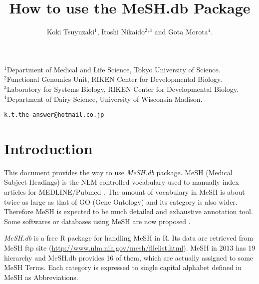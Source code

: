 \documentclass[11pt]{article}
\newcommand{\Rpackage}[1]{{\textit{#1}}}
\begin{document}

\title{\bf How to use the MeSH.db Package}
\author{Koki Tsuyuzaki$^1$, Itoshi Nikaido$^2$$^,$$^3$ and Gota Morota$^4$.}
\maketitle
\begin{center}
\noindent
$^1$Department of Medical and Life Science, Tokyo University of Science.\\
\noindent
$^2$Functional Genomics Unit, RIKEN Center for Developmental Biology.\\
\noindent
$^3$Laboratory for Systems Biology, RIKEN Center for Developmental Biology.\\
\noindent
$^4$Department of Dairy Science, University of Wisconsin-Madison.\\
\end{center}

\begin{center}
{\tt k.t.the-answer@hotmail.co.jp}
\end{center}
\tableofcontents

\section{Introduction}
This document provides the way to use \Rpackage{MeSH.db} package. MeSH (Medical Subject Headings) is the NLM controlled vocabulary used to manually index articles for MEDLINE/Pubmed
\citep{Nelson2004}. The amount of vocabulary in MeSH is about twice as large as that of GO (Gene Ontology)\citep{Ashburner2000} and its category is also wider. Therefore MeSH is expected to be much detailed and exhaustive annotation tool. Some softwares or databases using MeSH are now proposed \citep{Nakazato2007,Nakazato2009,Saurin2010,Sartor2012}.

\Rpackage{MeSH.db} is a free R package for handling MeSH in R. Its data are retrieved from MeSH ftp site (\url{http://www.nlm.nih.gov/mesh/filelist.html}). MeSH in 2013 has 19 hierarchy and MeSH.db provides 16 of them, which are actually assigned to some MeSH Terms. Each category is expressed to single capital alphabet defined in MeSH as Abbreviations.
\end{document}

